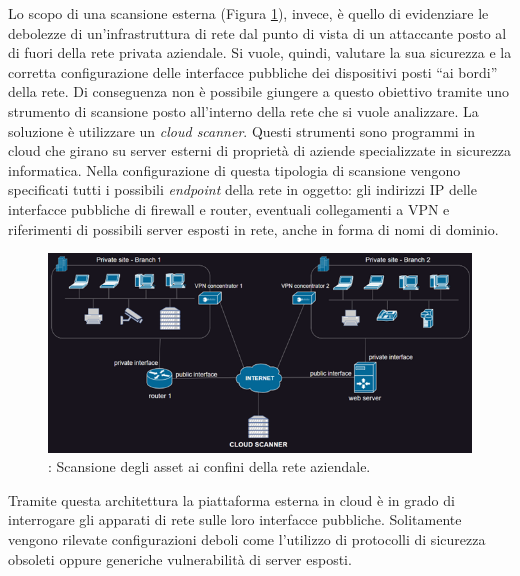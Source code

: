 \documentclass[target=bach,aauheader=]{thud}
\begin{document}
Lo scopo di una scansione esterna (Figura \ref{fig:scan_esterna}), invece, è quello di evidenziare le debolezze di un’infrastruttura di rete dal punto di vista di un attaccante posto al di fuori della rete privata aziendale. Si vuole, quindi, valutare la sua sicurezza e la corretta configurazione delle interfacce pubbliche dei dispositivi posti “ai bordi” della rete. Di conseguenza non è possibile giungere a questo obiettivo tramite uno strumento di scansione posto all’interno della rete che si vuole analizzare. La soluzione è utilizzare un \textit{cloud scanner}. Questi strumenti sono programmi in cloud che girano su server esterni di proprietà di aziende specializzate in sicurezza informatica. Nella configurazione di questa tipologia di scansione vengono specificati tutti i possibili \textit{endpoint} della rete in oggetto: gli indirizzi IP delle interfacce pubbliche di firewall e router, eventuali collegamenti a VPN e riferimenti di possibili server esposti in rete, anche in forma di nomi di dominio.


\begin{figure}[h]
\centering
\includegraphics[scale=1.2]{images/scan_esterna.png}
    \caption{: Scansione degli asset ai confini della rete aziendale.}
    \label{fig:scan_esterna}
\end{figure}


Tramite questa architettura la piattaforma esterna in cloud è in grado di interrogare gli apparati di rete sulle loro interfacce pubbliche. Solitamente vengono rilevate configurazioni deboli come l’utilizzo di protocolli di sicurezza obsoleti oppure generiche vulnerabilità di server esposti.
\end{document}
